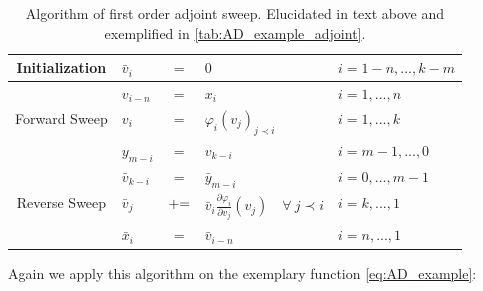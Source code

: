 \documentclass{scrartcl}[12pt, halfparskip]
\numberwithin{equation}{section}
\numberwithin{figure}{section}
\numberwithin{table}{section}
\begin{document}
\begin{table}[H]
	\centering
	\caption{Algorithm of first order adjoint sweep. Elucidated in text above and exemplified in \cref{tab:AD_example_adjoint}.}
	\begin{tabular}{| c | l c l | l |} \hline
		Initialization & $\bar{v}_i$ & $=$ & $0$ & $i=1-n,...,k-m$ \\ \hline
		& $v_{i-n}$ & $=$ & $x_i$ & $i=1,...,n$ \\
		Forward Sweep & $v_{i}$ & $=$ & $\varphi_i(v_j)_{j \prec i}$ & $i=1,...,k$ \\
		& $y_{m-i}$ & $=$ & $v_{k-i}$ & $i=m-1,...,0$ \\ \hline
		& $\bar{v}_{k-i}$ & $=$ & $\bar{y}_{m-i}$ & $i=0,...,m-1$ \\
		Reverse Sweep & $\bar{v}_j$ & $+ \hspace{-0.1cm} =$ & $\bar{v}_i \frac{\partial \varphi_i}{\partial v_j}(v_j) \quad \forall \ j \prec i$ & $i=k,...,1$ \\
		& $\bar{x}_i$ & $=$ & $\bar{v}_{i-n}$ & $i=n,...,1$ \\ \hline
	\end{tabular}
	\label{tab:first_order_adjoint_sweep}
\end{table}

Again we apply this algorithm on the exemplary function \cref{eq:AD_example}:
\end{document}
